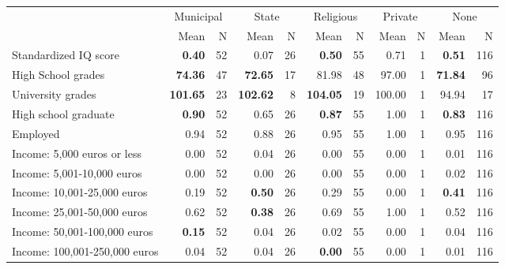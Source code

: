\begin{tabular}{l r r r r r r r r r r}
\toprule
& \multicolumn{2}{c}{Municipal} & \multicolumn{2}{c}{State} & \multicolumn{2}{c}{Religious} & \multicolumn{2}{c}{Private} & \multicolumn{2}{c}{None} \\
& \scriptsize Mean & \scriptsize N & \scriptsize Mean & \scriptsize N & \scriptsize Mean & \scriptsize N & \scriptsize Mean & \scriptsize N & \scriptsize Mean & \scriptsize N \\
\midrule
Standardized IQ score & \textbf{     0.40} &        52 &      0.07 &        26 & \textbf{     0.50} &        55 &      0.71 &         1 & \textbf{     0.51} &       116 \\
High School grades & \textbf{    74.36} &        47 & \textbf{    72.65} &        17 &     81.98 &        48 &     97.00 &         1 & \textbf{    71.84} &        96 \\
University grades & \textbf{   101.65} &        23 & \textbf{   102.62} &         8 & \textbf{   104.05} &        19 &    100.00 &         1 &     94.94 &        17 \\
High school graduate & \textbf{     0.90} &        52 &      0.65 &        26 & \textbf{     0.87} &        55 &      1.00 &         1 & \textbf{     0.83} &       116 \\
Employed &      0.94 &        52 &      0.88 &        26 &      0.95 &        55 &      1.00 &         1 &      0.95 &       116 \\
Income: 5,000 euros or less &      0.00 &        52 &      0.04 &        26 &      0.00 &        55 &      0.00 &         1 &      0.01 &       116 \\
Income: 5,001-10,000 euros &      0.00 &        52 &      0.00 &        26 &      0.00 &        55 &      0.00 &         1 &      0.02 &       116 \\
Income: 10,001-25,000 euros &      0.19 &        52 & \textbf{     0.50} &        26 &      0.29 &        55 &      0.00 &         1 & \textbf{     0.41} &       116 \\
Income: 25,001-50,000 euros &      0.62 &        52 & \textbf{     0.38} &        26 &      0.69 &        55 &      1.00 &         1 &      0.52 &       116 \\
Income: 50,001-100,000 euros & \textbf{     0.15} &        52 &      0.04 &        26 &      0.02 &        55 &      0.00 &         1 &      0.04 &       116 \\
Income: 100,001-250,000 euros &      0.04 &        52 &      0.04 &        26 & \textbf{     0.00} &        55 &      0.00 &         1 &      0.01 &       116 \\

\end{tabular}
